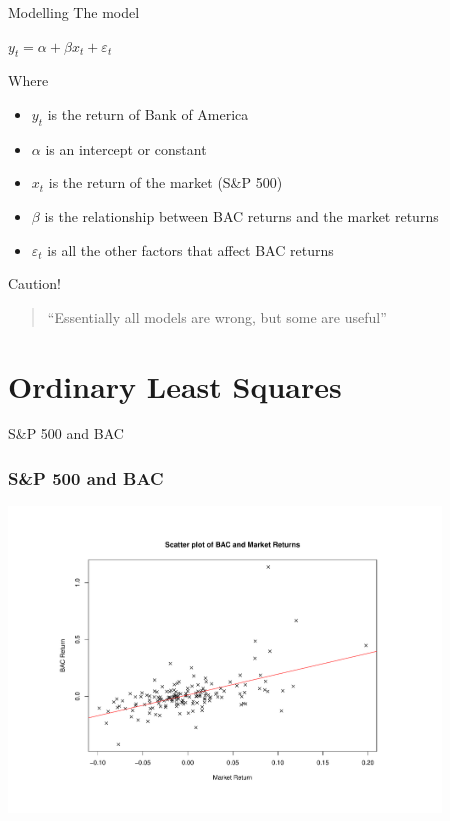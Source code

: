 \documentclass[14pt,xcolor=pdftex,dvipsnames,table]{beamer}\usepackage[]{graphicx}\usepackage[]{color}
\begin{document}
\begin{frame}{Modelling}
The model
\begin{block}{}
$y_t = \alpha + \beta x_t + \varepsilon_t$
\end{block}

\pause

Where 
\begin{itemize}[<+-| alert@+>]
\item $y_t$ is the return of Bank of America
\item $\alpha$ is an intercept or constant
\item $x_t$ is the return of the market (S\&P 500)
\item $\beta$ is the relationship between BAC returns and the market returns
\item $\varepsilon_t$ is all the other factors that affect BAC returns
\end{itemize}
\end{frame}


\begin{frame}{Caution!}
\begin{block}{}
\begin{quote} ``Essentially all models are wrong, but some are useful''
\end{quote} \citep[p. 424]{Box}
\end{block}
\end{frame}



\section{Ordinary Least Squares}
\begin{frame}{S\&P 500 and BAC}
\graphicspath{{./Figures/}}
\frametitle{S\&P 500 and BAC}
\begin{center}
\includegraphics[height = 3.2in]{BACeq}
\end{center}
\end{frame} 
\end{document}
